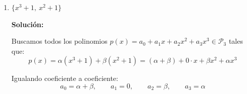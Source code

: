 \documentclass[12pt]{article}
\newcommand{\solucion}{%
    \vspace{0.8em}%
    \textbf{Solución:}%
    \vspace{0.8em}%
}
\begin{document}
\begin{enumerate}[label=\alph*.-]
    \solucion

    Buscamos todas las matrices $\begin{pmatrix}a&b\\c&d\end{pmatrix} \in \mathbb{R}^{2\times2}$ tales que:
    \[
    \begin{pmatrix}a&b\\c&d\end{pmatrix} = \alpha\begin{pmatrix}1&2\\0&0\end{pmatrix}+\beta\begin{pmatrix}0&-1\\1&0\end{pmatrix} = \begin{pmatrix}\alpha & 2\alpha-\beta \\ \beta & 0\end{pmatrix}
    \]

    Igualando entrada por entrada:
    \[
    a=\alpha, \qquad b=2\alpha-\beta, \qquad c=\beta, \qquad d=0
    \]

    Sustituyendo $\alpha=a$ y $\beta=c$ en la segunda igualdad se obtiene la condición de compatibilidad:
    \[
    b = 2a-c
    \]

    mientras que $d$ queda forzado a ser siempre $0$.

    \textbf{Conclusión:}
    \[
    \operatorname{gen}\left\{ \begin{pmatrix}1&2\\0&0\end{pmatrix}, \begin{pmatrix}0&-1\\1&0\end{pmatrix} \right\} = \left\{ \begin{pmatrix}a&b\\c&d\end{pmatrix} \in \mathbb{R}^{2\times2} \; \Big/ \; b=2a-c,\; d=0 \right\}
    \]

    \item $\{x^3 + 1,\ x^2 + 1\}$

    \solucion

    Buscamos todos los polinomios $p(x)=a_0+a_1x+a_2x^2+a_3x^3 \in \mathcal{P}_3$ tales que:
    \[
    p(x) = \alpha(x^3+1)+\beta(x^2+1) = (\alpha+\beta) + 0\cdot x + \beta x^2 + \alpha x^3
    \]

    Igualando coeficiente a coeficiente:
    \[
    a_0=\alpha+\beta, \qquad a_1=0, \qquad a_2=\beta, \qquad a_3=\alpha
    \]


\end{enumerate}
\end{document}
